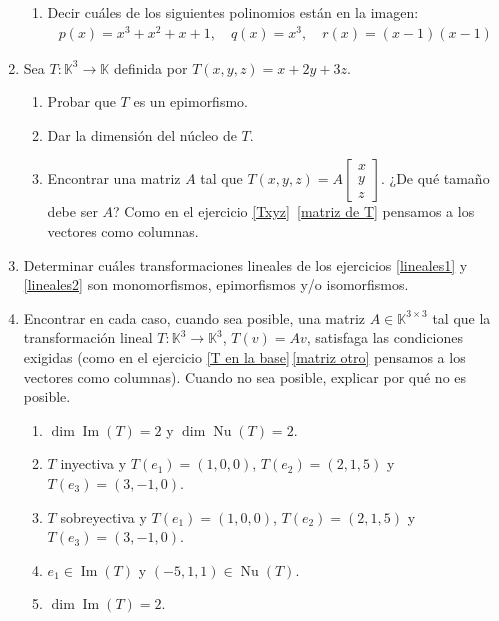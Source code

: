 \begin{enumerate}[topsep=6pt, itemsep=.4cm]
\begin{enumerate}
        \item Decir cuáles de los siguientes polinomios están en la imagen:
            \begin{align*}
                p(x)=x^3+x^2+x+1,\quad q(x)=x^3, \quad r(x)=(x-1)(x-1) 
            \end{align*}
    \end{enumerate}



\item\label{funcional ej}  Sea $T:\mathbb{K}^3\longrightarrow\mathbb{K}$ definida por $T(x,y,z)=x+2y+3z$.
\begin{enumerate}
    \item Probar que $T$ es un epimorfismo.
    \item Dar la dimensión del núcleo de $T$.
    \item Encontrar una matriz $A$ tal que
        $T(x,y,z)=A\begin{bmatrix}
        x\\y\\z \end{bmatrix}$. ¿De qué tamaño debe ser $A$? Como en el ejercicio \ref{Txyz}\, \ref{matriz de T} pensamos a los vectores como columnas. 
\end{enumerate}


\item Determinar cuáles transformaciones lineales de los ejercicios  \ref{lineales1} y \ref{lineales2} son monomorfismos, epimorfismos y/o isomorfismos.



\item\label{usar-1} Encontrar en cada caso, cuando sea posible, una matriz $A\in\mathbb{K}^{3\times 3}$ tal que la transformación lineal $T:\mathbb{K}^3\longrightarrow\mathbb{K}^3$, $T(v)=Av$, satisfaga las condiciones exigidas (como en el ejercicio  \ref{T en la base}\,\ref{matriz otro} pensamos a los vectores como columnas). Cuando no sea posible, explicar por qué no es posible.
\begin{enumerate}[ topsep=5pt,itemsep=5pt]
    \item $\operatorname{dim} \operatorname{Im}(T)=2$ y $\operatorname{dim}\operatorname{Nu}(T)=2$.
    \item $T$ inyectiva y $T(e_1)=(1,0,0)$, $T(e_2)=(2,1,5)$ y $T(e_3)=(3,-1,0)$.
    \item $T$ sobreyectiva y $T(e_1)=(1,0,0)$, $T(e_2)=(2,1,5)$ y $T(e_3)=(3,-1,0)$.
    \item $e_1\in\operatorname{Im}(T)$ y $(-5,1,1)\in\operatorname{Nu}(T)$.
    \item $\operatorname{dim} \operatorname{Im}(T)=2$.
\end{enumerate}
    


\end{enumerate}


